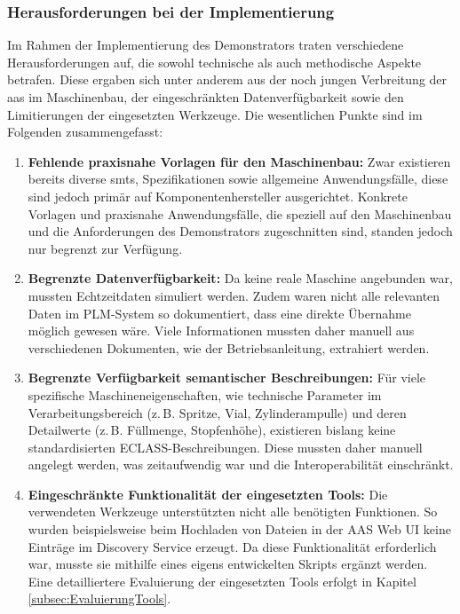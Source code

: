 \subsubsection{Herausforderungen bei der Implementierung}
Im Rahmen der Implementierung des Demonstrators traten verschiedene Herausforderungen auf, die sowohl technische als auch methodische Aspekte betrafen. 
Diese ergaben sich unter anderem aus der noch jungen Verbreitung der \acs{aas} im Maschinenbau, der eingeschränkten Datenverfügbarkeit sowie den Limitierungen der eingesetzten Werkzeuge. 
Die wesentlichen Punkte sind im Folgenden zusammengefasst:

\begin{enumerate}
    \item \textbf{Fehlende praxisnahe Vorlagen für den Maschinenbau:}  
    Zwar existieren bereits diverse \acsp{smt}, Spezifikationen sowie allgemeine Anwendungsfälle, diese sind jedoch primär auf Komponentenhersteller ausgerichtet.  
    Konkrete Vorlagen und praxisnahe Anwendungsfälle, die speziell auf den Maschinenbau und die Anforderungen des Demonstrators zugeschnitten sind, standen jedoch nur begrenzt zur Verfügung.

    \item \textbf{Begrenzte Datenverfügbarkeit:}  
    Da keine reale Maschine angebunden war, mussten Echtzeitdaten simuliert werden.  
    Zudem waren nicht alle relevanten Daten im PLM-System so dokumentiert, dass eine direkte Übernahme möglich gewesen wäre.  
    Viele Informationen mussten daher manuell aus verschiedenen Dokumenten, wie der Betriebsanleitung, extrahiert werden.  

    \item \textbf{Begrenzte Verfügbarkeit semantischer Beschreibungen:}  
    Für viele spezifische Maschineneigenschaften, wie technische Parameter im Verarbeitungsbereich (z.\,B. Spritze, Vial, Zylinderampulle) und deren Detailwerte (z.\,B. Füllmenge, Stopfenhöhe), existieren bislang keine standardisierten ECLASS-Beschreibungen.  
    Diese mussten daher manuell angelegt werden, was zeitaufwendig war und die Interoperabilität einschränkt.

    \item \textbf{Eingeschränkte Funktionalität der eingesetzten Tools:}  
    Die verwendeten Werkzeuge unterstützten nicht alle benötigten Funktionen.  
    So wurden beispielsweise beim Hochladen von Dateien in der AAS Web UI keine Einträge im Discovery Service erzeugt.  
    Da diese Funktionalität erforderlich war, musste sie mithilfe eines eigens entwickelten Skripts ergänzt werden.  
    Eine detailliertere Evaluierung der eingesetzten Tools erfolgt in Kapitel \ref{subsec:EvaluierungTools}.


\end{enumerate}
